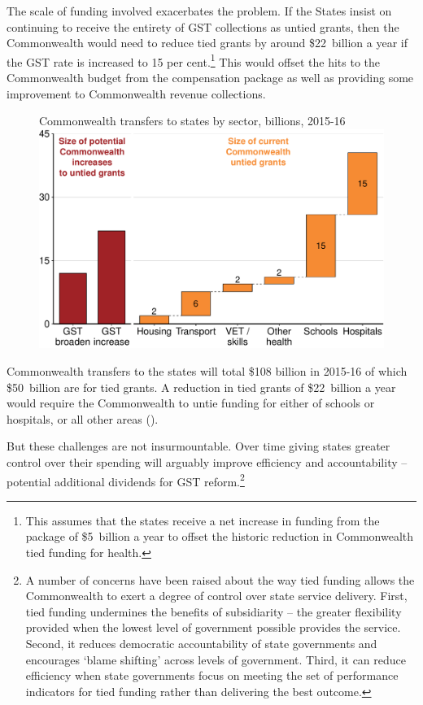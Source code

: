 The scale of funding involved exacerbates the problem. If the States insist on continuing to receive the entirety of GST collections as untied grants, then the Commonwealth would need to reduce tied grants by around \$22~billion a year if the GST rate is increased to 15 per cent.\footnote{This assumes that the states receive a net increase in funding from the package of \$5~billion a year to offset the historic reduction in Commonwealth tied funding for health.}   This would offset the hits to the Commonwealth budget from the compensation package as well as providing some improvement to Commonwealth revenue collections.

\begin{figure}[p]
%
{Commonwealth transfers to states by sector, billions, 2015-16}
\includegraphics[width=\linewidth]{atlas/figure/GST-Figure-10-2.pdf}
\vspace{20pt} %
\end{figure}

Commonwealth transfers to the states will total \$108 billion in \mbox{2015-16} of which \$50~billion are for tied grants. A reduction in tied grants of \$22~billion a year would require the Commonwealth to untie funding for either of schools or hospitals, or all other areas (). 

But these challenges are not insurmountable. Over time giving states greater control over their spending will arguably improve efficiency and accountability  – potential additional dividends for GST reform.\footnote{A number of concerns have been raised about the way tied funding allows the Commonwealth to exert a degree of control over state service delivery. First, tied funding undermines the benefits of subsidiarity – the greater flexibility provided when the lowest level of government possible provides the service. Second, it reduces democratic accountability of state governments and encourages ‘blame shifting’ across levels of government. Third, it can reduce efficiency when state governments focus on meeting the set of performance indicators for tied funding rather than delivering the best outcome.}

